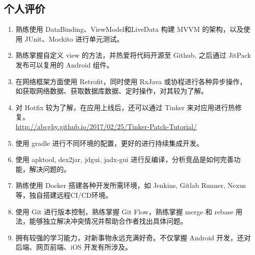 \documentclass[11pt]{res}
\begin{document}
\begin{resume}
\section{个人评价}
  \begin{enumerate}
      \item 熟练使用 DataBinding、ViewModel和LiveData 构建 MVVM 的架构，以及使用 JUnit、Mockito 进行单元测试。
      \item 熟练掌握自定义 view 的方法，并热爱将代码开源至 Github, 之后通过 JitPack 发布可以复用的 Android 组件。
      \item 在网络框架方面使用 Retrofit，同时使用 RxJava 或协程进行各种异步操作，如获取网络数据、获取数据库数据、定时操作，对其较为了解。
      \item 对 Hotfix 较为了解，在应用上线后，还可以通过 Tinker 来对应用进行热修复。\\ \url{http://abcghy.github.io/2017/02/25/Tinker-Patch-Tutorial/}
      \item 使用 gradle 进行不同环境的配置，更好的进行持续集成开发。
      \item 使用 apktool, dex2jar, jdgui, jadx-gui 进行反编译，分析竞品是如何完善功能，解决问题的。
      \item 熟练使用 Docker 搭建各种开发所需环境，如 Jenkins, Gitlab Runner, Nexus 等，独自搭建远程CI/CD环境。
      \item 使用 Git 进行版本控制，熟练掌握 Git Flow，熟练掌握 merge 和 rebase 用法，能够独立解决冲突情况并帮助合作者找出具体问题。
      \item 拥有较强的学习能力，对新事物永远充满好奇。不仅掌握 Android 开发，还对后端、网页前端、iOS 开发有所涉及。
  \end{enumerate}

\end{resume}
\end{document}
